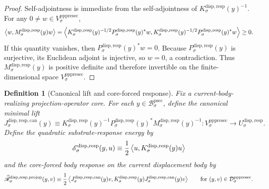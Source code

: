 \documentclass[11pt]{article}
\newcommand{\ProtoSectionBody}[1]{\mathcal B_{#1}^{\mathrm{psec}}}
\newcommand{\PrePreProtoSectionVertical}[1]{V_{#1}^{\mathrm{pppresec}}}
\newcommand{\PrePreProtoSectionResidualBody}[1]{\mathcal D_{#1}^{\mathrm{pppresec}}}
\newcommand{\SubstrateCarrier}[1]{U_{#1}^{\mathrm{disp,resp}}}
\newcommand{\SubstrateProjection}[1]{P_{#1}^{\mathrm{disp,resp}}}
\newcommand{\SubstrateOperator}[1]{K_{#1}^{\mathrm{disp,resp}}}
\newcommand{\CanonicalLift}[1]{J_{#1}^{\mathrm{disp,resp,can}}}
\newcommand{\SubstrateEnergy}[1]{\mathscr E_{#1}^{\mathrm{disp,resp}}}
\newcommand{\CoreForcedBodyResponse}[1]{\widehat{\mathscr R}_{#1}^{\mathrm{disp,resp,projop}}}
\newcommand{\SchurResponse}[1]{M_{#1}^{\mathrm{disp,resp}}}
\newtheorem{definition}{Definition}
\begin{document}
\begin{proof}
Self-adjointness is immediate from the self-adjointness of \(\SubstrateOperator{\sigma}(y)^{-1}\). For any \(0\neq w\in\PrePreProtoSectionVertical{\sigma}\),
\[
\ev{w,\SchurResponse{\sigma}(y)w}
=
\ev{
\SubstrateOperator{\sigma}(y)^{-1/2}\SubstrateProjection{\sigma}(y)^*w,
\SubstrateOperator{\sigma}(y)^{-1/2}\SubstrateProjection{\sigma}(y)^*w
}
\ge 0.
\]
If this quantity vanishes, then \(\SubstrateProjection{\sigma}(y)^*w=0\). Because \(\SubstrateProjection{\sigma}(y)\) is surjective, its Euclidean adjoint is injective, so \(w=0\), a contradiction. Thus \(\SchurResponse{\sigma}(y)\) is positive definite and therefore invertible on the finite-dimensional space \(\PrePreProtoSectionVertical{\sigma}\).
\end{proof}

\begin{definition}[Canonical lift and core-forced response]
\label{def:canonical}
Fix a current-body-realizing projection-operator core. For each \(y\in\ProtoSectionBody{\sigma}\), define the \emph{canonical minimal lift}
\begin{equation}
\CanonicalLift{\sigma}(y)
\equiv
\SubstrateOperator{\sigma}(y)^{-1}\SubstrateProjection{\sigma}(y)^*
\SchurResponse{\sigma}(y)^{-1}
:
\PrePreProtoSectionVertical{\sigma}\to\SubstrateCarrier{\sigma}.
\label{eq:canonical}
\end{equation}
Define the quadratic substrate-response energy by
\[
\SubstrateEnergy{\sigma}(y,u)
\equiv
\frac{1}{2}
\ev{u,\SubstrateOperator{\sigma}(y)u}
\]
and the \emph{core-forced body response} on the current displacement body by
\begin{equation}
\CoreForcedBodyResponse{\sigma}(y,v)
\equiv
\frac{1}{2}
\ev{
\CanonicalLift{\sigma}(y)v,
\SubstrateOperator{\sigma}(y)\CanonicalLift{\sigma}(y)v
}
\qquad
\text{for }
(y,v)\in\PrePreProtoSectionResidualBody{\sigma}.
\label{eq:coreresponse}
\end{equation}
\end{definition}
\end{document}
